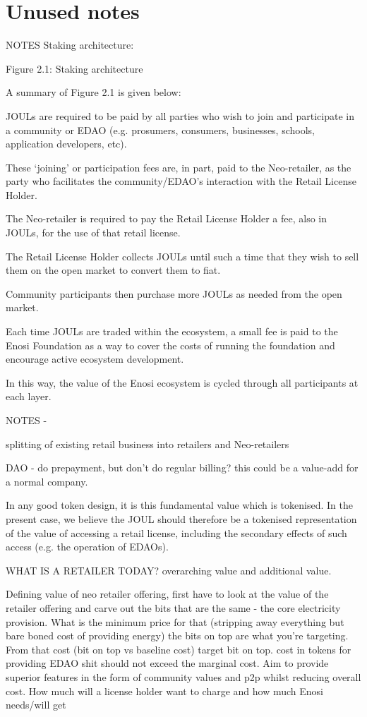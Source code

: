 \documentclass{article}
\theoremstyle{definition}
\theoremstyle{plain} %
\begin{document}
\pagebreak
\section{Unused notes}

NOTES
Staking architecture:

Figure 2.1: Staking architecture	

A summary of Figure 2.1 is given below:

JOULs are required to be paid by all parties who wish to join and participate in a community or EDAO (e.g. prosumers, consumers, businesses, schools, application developers, etc).

These ‘joining’ or participation fees are, in part, paid to the Neo-retailer, as the party who facilitates the community/EDAO’s interaction with the Retail License Holder. 


The Neo-retailer is required to pay the Retail License Holder a fee, also in JOULs, for the use of that retail license. 

The Retail License Holder collects JOULs until such a time that they wish to sell them on the open market to convert them to fiat. 


Community participants then purchase more JOULs as needed from the open market.


Each time JOULs are traded within the ecosystem, a small fee is paid to the Enosi Foundation as a way to cover the costs of running the foundation and encourage active ecosystem development.

In this way, the value of the Enosi ecosystem is cycled through all participants at each layer. 





NOTES - 

splitting of existing retail business into retailers and Neo-retailers

DAO - do prepayment, but don’t do regular billing? this could be a value-add for a normal company.


In any good token design, it is this fundamental value which is tokenised. In the present case, we believe the JOUL should therefore be a tokenised representation of the value of accessing a retail license, including the secondary effects of such access (e.g. the operation of EDAOs).

WHAT IS A RETAILER TODAY? overarching value and additional value.

Defining value of neo retailer offering, first have to look at the value of the retailer offering and carve out the bits that are the same - the core electricity provision. What is the minimum price for that (stripping away everything but bare boned cost of providing energy) the bits on top are what you're targeting. From that cost (bit on top vs baseline cost) target bit on top. cost in tokens for providing EDAO shit should not exceed the marginal cost. Aim to provide superior features in the form of community values and p2p whilst reducing overall cost. How much will a license holder want to charge and how much Enosi needs/will get
\end{document}
